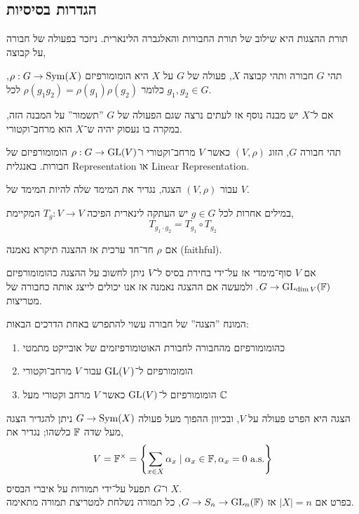 \subsection{הגדרות בסיסיות}
תורת ההצגות היא שילוב של תורת החבורות והאלגברה הלינארית.
ניזכר בפעולה של חבורה על קבוצה,
\begin{definition}
	תהי $G$ חבורה ותהי קבוצה $X$, פעולה של $G$ על $X$ היא הומומורפיזם $\rho : G \to \operatorname{Sym}(X)$, כלומר $\rho(g_1 g_2) = \rho(g_1) \rho(g_2)$ לכל $g_1, g_2 \in G$.
\end{definition}
אם ל־$X$ יש מבנה נוסף אז לעתים נרצה שגם הפעולה של $G$ ''תשמור'' על המבנה הזה, במקרה בו נעסוק יהיה ש־$X$ הוא מרחב־וקטורי.
\begin{definition}
	תהי חבורה $G$, הזוג $(V, \rho)$ כאשר $V$ מרחב־וקטורי ו־$\rho : G \to \operatorname{GL}(V)$ הומומורפיזם של חבורות.
	באנגלית Representation או Linear Representation.
\end{definition}
\begin{definition}
	עבור $(V, \rho)$ הצגה, נגדיר את המימד שלה להיות המימד של $V$.
\end{definition}
במילים אחרות לכל $g \in G$ יש העתקה לינארית הפיכה $T_g : V \to V$ המקיימת,
\[
	T_{g_1 \cdot g_2}
	= T_{g_1} \circ T_{g_2}
\]
\begin{definition}
	אם $\rho$ חד־חד ערכית אז ההצגה תיקרא נאמנה (faithful).
\end{definition}
אם $V$ סוף־מימדי אז על־ידי בחירת בסיס ל־$V$ ניתן לחשוב על ההצגה כהומומורפיזם $G \to \operatorname{GL}_{\dim V}(\mathbb{F})$.
ולמעשה אם ההצגה נאמנה אז אנו יכולים לייצג אותה כחבורה של מטריצות.
\begin{remark}
	המונח ''הצגה'' של חבורה עשוי להתפרש באחת הדרכים הבאות:
	\begin{enumerate}
		\item כהומומורפיזם מהחבורה לחבורת האוטומורפיזמים של אובייקט מתמטי
		\item הומומורפיזם ל־$\operatorname{GL}(V)$ עבור $V$ מרחב־וקטורי
		\item הומומורפיזם ל־$\operatorname{GL}(V)$ כאשר $V$ מרחב וקטורי מעל $\mathbb{C}$
	\end{enumerate}
\end{remark}
\begin{remark}
	הצגה היא הפרט פעולה על $V$, ובכיוון ההפוך מעל פעולה $G \to \operatorname{Sym}(X)$ ניתן להגדיר הצגה מעל שדה $\mathbb{F}$ כלשהו;
	נגדיר את,
	\[
		V = \mathbb{F}^\times = \left\{ \sum_{x \in X} \alpha_x \mid \alpha_x \in \mathbb{F}, \alpha_x = 0 \text{ a.s.} \right\}
	\]
	ו־$G$ תפעל על־ידי תמורות על איברי הבסיס $X$. \\
	בפרט אם $|X| = n$ אז $G \to S_n \to \operatorname{GL}_n(\mathbb{F})$, כל תמורה נשלחת למטריצת תמורה מתאימה.
\end{remark}
